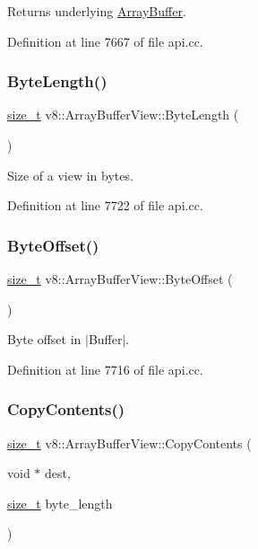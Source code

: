 Returns underlying \mbox{\hyperlink{classv8_1_1ArrayBuffer}{Array\+Buffer}}. 

Definition at line 7667 of file api.\+cc.

\mbox{\label{classv8_1_1ArrayBufferView_a9fc7563c97e0b639a6c0a3274995bb3c}} 
\subsubsection{\texorpdfstring{Byte\+Length()}{ByteLength()}}
{\footnotesize\ttfamily \mbox{\hyperlink{classsize__t}{size\+\_\+t}} v8\+::\+Array\+Buffer\+View\+::\+Byte\+Length (\begin{DoxyParamCaption}{ }\end{DoxyParamCaption})}

Size of a view in bytes. 

Definition at line 7722 of file api.\+cc.

\mbox{\label{classv8_1_1ArrayBufferView_a4739a31269f5ebc5b88a708b9429c688}} 
\subsubsection{\texorpdfstring{Byte\+Offset()}{ByteOffset()}}
{\footnotesize\ttfamily \mbox{\hyperlink{classsize__t}{size\+\_\+t}} v8\+::\+Array\+Buffer\+View\+::\+Byte\+Offset (\begin{DoxyParamCaption}{ }\end{DoxyParamCaption})}

Byte offset in $\vert$\+Buffer$\vert$. 

Definition at line 7716 of file api.\+cc.

\mbox{\label{classv8_1_1ArrayBufferView_aa728e762ed43194f3a5e05e792fff64e}} 
\subsubsection{\texorpdfstring{Copy\+Contents()}{CopyContents()}}
{\footnotesize\ttfamily \mbox{\hyperlink{classsize__t}{size\+\_\+t}} v8\+::\+Array\+Buffer\+View\+::\+Copy\+Contents (\begin{DoxyParamCaption}\item[{void $\ast$}]{dest,  }\item[{\mbox{\hyperlink{classsize__t}{size\+\_\+t}}}]{byte\+\_\+length }\end{DoxyParamCaption})}

